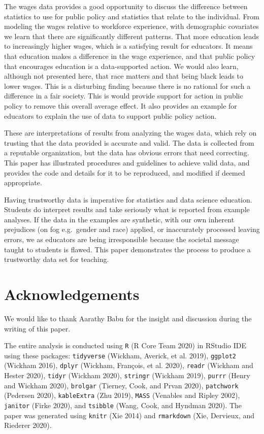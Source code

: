 \documentclass{article}
\begin{document}
The wages data provides a good opportunity to discuss the difference between statistics to use for public policy and statistics that relate to the individual. From modeling the wages relative to workforce experience, with demographic covariates we learn that there are significantly different patterns. That more education leads to increasingly higher wages, which is a satisfying result for educators. It means that education makes a difference in the wage experience, and that public policy that encourages education is a data-supported action. We would also learn, although not presented here, that race matters and that being black leads to lower wages. This is a disturbing finding because there is no rational for such a difference in a fair society. This is would provide support for action in public policy to remove this overall average effect. It also provides an example for educators to explain the use of data to support public policy action.

These are interpretations of results from analyzing the wages data, which rely on trusting that the data provided is accurate and valid. The data is collected from a reputable organization, but the data has obvious errors that need correcting. This paper has illustrated procedures and guidelines to achieve valid data, and provides the code and details for it to be reproduced, and modified if deemed appropriate.

Having trustworthy data is imperative for statistics and data science education. Students do interpret results and take seriously what is reported from example analyses. If the data in the examples are synthetic, with our own inherent prejudices (on fog e.g.~gender and race) applied, or inaccurately processed leaving errors, we as educators are being irresponsible because the societal message taught to students is flawed. This paper demonstrates the process to produce a trustworthy data set for teaching.

\hypertarget{acknowledgements}{%
\section{Acknowledgements}\label{acknowledgements}}

We would like to thank Aarathy Babu for the insight and discussion during the writing of this paper.

The entire analysis is conducted using \texttt{R} (R Core Team 2020) in RStudio IDE using these packages: \texttt{tidyverse} (Wickham, Averick, et al. 2019), \texttt{ggplot2} (Wickham 2016), \texttt{dplyr} (Wickham, François, et al. 2020), \texttt{readr} (Wickham and Hester 2020), \texttt{tidyr} (Wickham 2020), \texttt{stringr} (Wickham 2019), \texttt{purrr} (Henry and Wickham 2020), \texttt{brolgar} (Tierney, Cook, and Prvan 2020), \texttt{patchwork} (Pedersen 2020), \texttt{kableExtra} (Zhu 2019), \texttt{MASS} (Venables and Ripley 2002), \texttt{janitor} (Firke 2020), and \texttt{tsibble} (Wang, Cook, and Hyndman 2020). The paper was generated using \texttt{knitr} (Xie 2014) and \texttt{rmarkdown} (Xie, Dervieux, and Riederer 2020).
\end{document}
